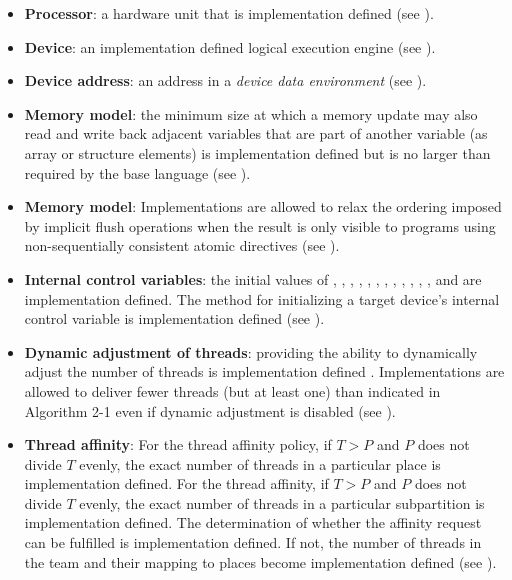 \begin{itemize}
\item \textbf{Processor}: a hardware unit that is implementation defined (see
).

\item \textbf{Device}: an implementation defined logical execution engine (see
).

\item \textbf{Device address}: an address in a \emph{device data environment} (see ).

\item \textbf{Memory model}: the minimum size at which a memory update may also read and
write back adjacent variables that are part of another variable (as array or structure
elements) is implementation defined but is no larger than required by the base
language (see ).

\item \textbf{Memory model}: Implementations are allowed to relax the ordering imposed by
implicit flush operations when the result is only visible to programs using
non-sequentially consistent atomic directives (see ).

\item \textbf{Internal control variables}: the initial values of
, , , ,
, , ,
, ,
, , ,
 and  are implementation defined.  The method for
initializing a target device's internal control variable is
implementation defined (see ).

\item \textbf{Dynamic adjustment of threads}: providing the ability to dynamically adjust the
number of threads is implementation defined . Implementations are allowed to deliver
fewer threads (but at least one) than indicated in Algorithm 2-1 even if dynamic
adjustment is disabled (see ).

\item \textbf{Thread affinity}: For the  thread affinity
  policy, if $T > P$ and $P$ does not divide $T$ evenly, the exact
  number of threads in a particular place is implementation defined.
  For the  thread affinity, if $T > P$ and $P$ does not
  divide $T$ evenly, the exact number of threads in a particular
  subpartition is implementation defined.  The determination of
  whether the affinity request can be fulfilled is implementation
  defined.  If not, the number of threads in the team and their mapping
  to places become implementation defined (see
  ).


\end{itemize}

